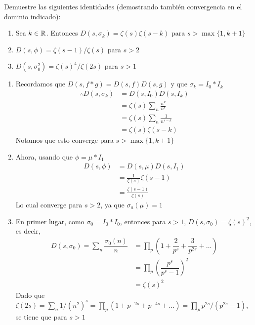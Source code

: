 \begin{prob}[2 pts. c/u]
    Demuestre las siguientes identidades (demostrando también convergencia en el dominio indicado):
    \begin{enumerate}[label = (\roman*)]
        \item Sea $k\in\mathbb{R}$. Entonces $D(s,\sigma_k)=\zeta(s)\zeta(s-k)$ para $s>\max\{1,k+1\}$

        \item $D(s,\phi)=\zeta(s-1)/\zeta(s)$ para $s>2$

        \item $D(s,\sigma_0^2)=\zeta(s)^4/\zeta(2s)$ para $s>1$
    \end{enumerate}
\end{prob}
\begin{sol}
    \begin{enumerate}[label = (\roman*)]
        \item Recordamos que $D(s,f*g)=D(s,f)D(s,g)$ y que $\sigma_k=I_0*I_k$
        \begin{align*}
            \therefore D(s,\sigma_k)&=D(s,I_0)D(s,I_k)\\
            &=\zeta(s)\sum_n\frac{n^k}{n^s}\\
            &=\zeta(s)\sum_n\frac{1}{n^{s-k}}\\
            &=\zeta(s)\zeta(s-k)
        \end{align*}
        Notamos que esto converge para $s>\max\{1,k+1\}$

        \item Ahora, usando que $\phi=\mu*I_1$
        \begin{align*}
            D(s,\phi)&=D(s,\mu)D(s,I_1)\\
            &=\frac{1}{\zeta(s)}\zeta(s-1)\\
            &=\frac{\zeta(s-1)}{\zeta(s)}
        \end{align*}
        Lo cual converge para $s>2$, ya que $\sigma_a(\mu)=1$

        \item En primer lugar, como $\sigma_0 = I_0 \ast I_0$, entonces para $s>1$, $D(s,\sigma_0) = \zeta(s)^2$, es decir,
        \begin{align*}
            D(s,\sigma_0) = \sum_n \dfrac{\sigma_0(n)}{n} &= \prod_p \left(1 + \dfrac{2}{p^s} + \dfrac{3}{p^{2s}} + \ldots\right)\\
            &= \prod_p \left(\dfrac{p^s}{p^s-1}\right)^2\\
            &= \zeta(s)^2
        \end{align*}
        Dado que $\zeta(2s) = \sum_n 1/(n^2)^s = \prod_p (1 + p^{-2s} + p^{-4s} + \ldots) = \prod_p p^{2s}/(p^{2s}-1)$, se tiene que para $s>1$


\end{enumerate}
\end{sol}
